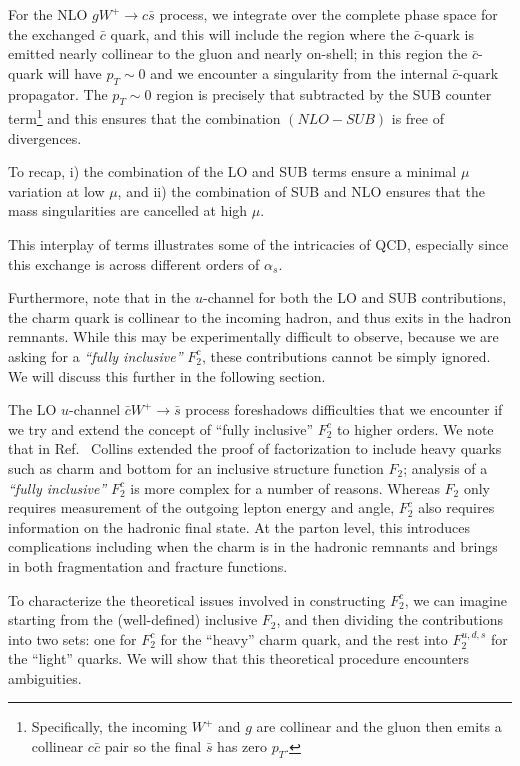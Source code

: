 For the NLO $gW^{+}\to c\bar{s}$ process, we integrate over the
complete phase space for the exchanged $\bar{c}$ quark, and this will
include the region where the $\bar{c}$-quark is emitted nearly
collinear to the gluon and nearly on-shell; in this region the
$\bar{c}$-quark will have $p_{T}\sim 0$ and we encounter a singularity
from the internal $\bar{c}$-quark propagator. The $p_{T}\sim 0$ region
is precisely that subtracted by the SUB counter
term\footnote{Specifically, the incoming $W^{+}$ and $g$ are
  collinear and the gluon then emits a collinear $c\bar{c}$ pair so
  the final $\bar{s}$ has zero $p_{T}$.} and this ensures that the
combination $(NLO-SUB)$ is free of divergences.

%
To recap, i) the combination of the LO and SUB terms ensure a minimal
$\mu$ variation at low $\mu$, and ii) the combination of SUB and NLO
ensures that the mass singularities are cancelled at high $\mu$.

This interplay of terms illustrates some of the intricacies of
QCD, especially since this exchange is across different orders of
$\alpha_{s}$.

Furthermore, note that in the $u$-channel for both the LO and SUB
contributions, the charm quark is collinear to the incoming hadron,
and thus exits in the hadron remnants. While this may be
experimentally difficult to observe, because we are asking for a
\textit{``fully inclusive''} $F_{2}^{c}$, these contributions cannot
be simply ignored. We will discuss this further in the following
section.

%
The LO $u$-channel \mbox{$\bar{c}W^{+}\to\bar{s}$} process foreshadows
difficulties that we encounter if we try and extend the concept of
``fully inclusive'' $F_{2}^{c}$ to higher orders. We note that in
Ref.~\cite{Collins:1998rz} Collins extended the proof of factorization
to include heavy quarks such as charm and bottom for an inclusive
structure function $F_{2}$;
analysis of a  \textit{``fully inclusive''} $F_{2}^{c}$
is more complex for a number of reasons. 
%
Whereas $F_2$ only requires measurement of the outgoing lepton energy
and angle, $F_2^c$ also requires information on the hadronic final state.  At
the parton level, this introduces complications including when the
charm is in the hadronic remnants and brings in both fragmentation and
fracture functions.

To characterize the theoretical issues involved in constructing
$F_{2}^{c}$, we can imagine starting from the (well-defined) inclusive
$F_{2}$, and then dividing the contributions into two sets: one for
$F_{2}^{c}$ for the ``heavy'' charm quark, and the rest into
$F_{2}^{u,d,s}$ for the ``light'' quarks. We will show that this
theoretical procedure encounters ambiguities.

